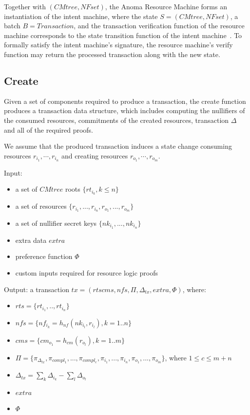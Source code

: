 Together with $(CMtree, NFset)$, the Anoma Resource Machine forms an instantiation of the intent machine, where the state $S = (CMtree, NFset)$, a batch $B = Transaction$, and the transaction verification function of the resource machine corresponds to the state transition function of the intent machine~\citep{art-2024-intent-machine}. To formally satisfy the intent machine's signature, the resource machine's verify function may return the processed transaction along with the new state.

\subsection{Create}

Given a set of components required to produce a transaction, the create function produces a transaction data structure, which includes computing the nullifiers of the consumed resources, commitments of the created resources, transaction $\Delta$ and all of the required proofs.

We assume that the produced transaction induces a state change consuming resources $r_{i_1},\cdots, r_{i_n}$ and creating resources $r_{o_1}, \cdots, r_{o_m}$.

Input: 
\begin{itemize}
    \item a set of $CMtree$ roots $\{rt_{i_k}, k \leq n\}$
    \item a set of resources $\{r_{i_1},...,r_{i_n}, r_{o_1},...,r_{o_m}\}$
    \item a set of nullifier secret keys $\{nk_{i_1},...,nk_{i_n}\}$
    \item extra data $extra$
    \item preference function $\Phi$
    \item custom inputs required for resource logic proofs
\end{itemize}

Output: a transaction $tx = (rts cms, nfs, \Pi, \Delta_{tx}, extra, \Phi)$, where:
\begin{itemize}
    \item $rts= \{rt_{i_1},..,rt_{i_n}\}$
    \item $nfs = \{nf_{i_k} = h_{nf}(nk_{i_l}, r_{i_l}), k = 1..n\}$
    \item $cms = \{cm_{o_1} = h_{cm}(r_{o_l}), k = 1..m\}$
    \item $\Pi = \{\pi_{\Delta_{tx}}, \pi_{compl_1}, ..., \pi_{compl_c}, \pi_{i_1}, ..., \pi_{i_n}, \pi_{o_1}, ...,\pi_{o_m}\}$, where $1 \leq c \leq m + n$
    \item $\Delta_{tx} = \sum_k{\Delta_{i_k}} - \sum_l{\Delta_{o_l}}$
    \item $extra$
    \item $\Phi$
\end{itemize}

